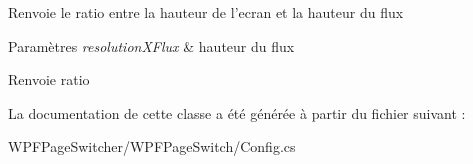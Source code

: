 Renvoie le ratio entre la hauteur de l'ecran et la hauteur du flux 


\begin{DoxyParams}{Paramètres}
{\em resolution\+X\+Flux} & hauteur du flux\\
\hline
\end{DoxyParams}
\begin{DoxyReturn}{Renvoie}
ratio
\end{DoxyReturn}


La documentation de cette classe a été générée à partir du fichier suivant \+:\begin{DoxyCompactItemize}
\item 
W\+P\+F\+Page\+Switcher/\+W\+P\+F\+Page\+Switch/Config.\+cs\end{DoxyCompactItemize}
